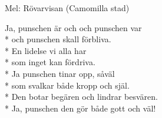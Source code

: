 \begin{SongText}
    \begin{SongInfo}
        Mel: Rövarvisan (Camomilla stad)
    \end{SongInfo}
    \begin{SongVerse}
        Ja, punschen är och och punschen var\\*%
        och punschen skall förbliva.\\*%
        En lidelse vi alla har\\*%
        som inget kan fördriva.\\*%
        Ja punschen tinar opp, såväl\\*%
        som svalkar både kropp och själ.\\*%
        Den botar begären och lindrar besvären.\\*%
        Ja, punschen den gör både gott och väl!
    \end{SongVerse}\end{SongText}
